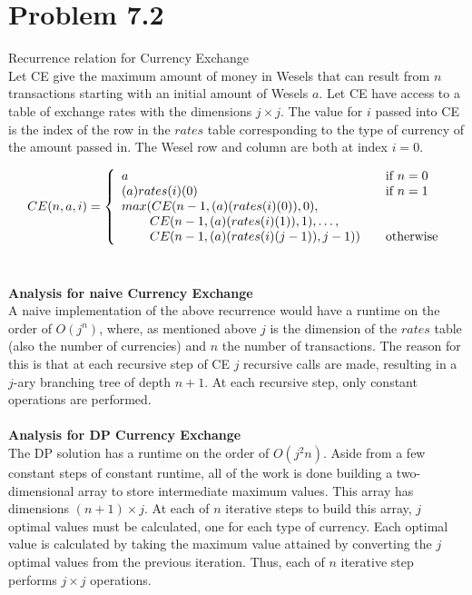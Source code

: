 \documentclass[12pt,letterpaper]{article}
\newcommand\hwnum{7}                  %
\newenvironment{answer}[2]{
  \section*{Problem \hwnum.#1}
}{\newpage}
\begin{document}
\begin{answer}{2}

\textbf{Recurrence relation for Currency Exchange}\\
Let CE give the maximum amount of money in Wesels that can result from $n$ transactions starting with an initial amount of Wesels $a$. Let CE have access to a table of exchange rates with the dimensions $j \times j$. The value for $i$ passed into CE is the index of the row in the $rates$ table corresponding to the type of currency of the amount passed in. The Wesel row and column are both at index $i=0$.

\[ CE(n, a, i) = \left\{ 
  \begin{array}{l l}
    a & \quad \text{if $n = 0$}\\
    (a)rates(i)(0) & \quad \text{if $n = 1$}\\
    max(CE(n-1, (a)(rates(i)(0)), 0), \\
    \;\;\;\;\;\;\;\;CE(n-1, (a)(rates(i)(1)), 1), \dots,\\
    \;\;\;\;\;\;\;\;CE(n-1, (a)(rates(i)(j-1)), j-1)) & \quad \text{otherwise}
  \end{array} \right.\]\\


\par
\textbf{Analysis for naive Currency Exchange} \\
A naive implementation of the above recurrence would have a runtime on the order of $O(j^n)$, where, as mentioned above $j$ is the dimension of the $rates$ table (also the number of currencies) and $n$ the number of transactions. The reason for this is that at each recursive step of CE $j$ recursive calls are made, resulting in a $j$-ary branching tree of depth $n+1$. At each recursive step, only constant operations are performed.\\\\

\textbf{Analysis for DP Currency Exchange} \\
The DP solution has a runtime on the order of $O(j^2n)$. Aside from a few constant steps of constant runtime, all of the work is done building a two-dimensional array to store intermediate maximum values. This array has dimensions $(n+1) \times j$. At each of $n$ iterative steps to build this array, $j$ optimal values must be calculated, one for each type of currency. Each optimal value is calculated by taking the maximum value attained by converting the $j$ optimal values from the previous iteration. Thus, each of $n$ iterative step performs $j \times j$ operations.

\end{answer}
\end{document}
